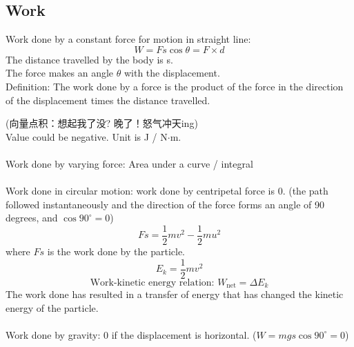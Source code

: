 \documentclass[a4paper,12pt]{article}
\begin{document}
\subsection{Work}
Work done by a constant force for motion in straight line:
\[W=Fs\cos\theta=F\times d\]
The distance travelled by the body is s. \\The force makes an angle $\theta$ with the displacement. \\Definition: The work done by a force is the product of the force in the direction of the displacement times the distance travelled.
\begin{center}
\end{center}
(向量点积：想起我了没? 晚了！怒气冲天ing)\\
Value could be negative. Unit is J / N$\cdot$m.\\\\
Work done by varying force: Area under a curve / integral\\\\
Work done in circular motion: work done by centripetal force is 0. (the path followed instantaneously and the direction of the force forms an angle of 90 degrees, and $\cos 90^\circ=0$)
\[Fs=\dfrac{1}{2}mv^2-\dfrac{1}{2}mu^2\]
where $Fs$ is the work done by the particle.
\[E_k=\dfrac{1}{2}mv^2\]
\[\text{Work-kinetic energy relation: }W_\text{net}=\Delta E_k\]
The work done has resulted in a transfer of energy that has changed the kinetic energy of the particle.\\\\
Work done by gravity: 0 if the displacement is horizontal. ($W=mgs\cos 90^\circ=0$)\\
\end{document}
